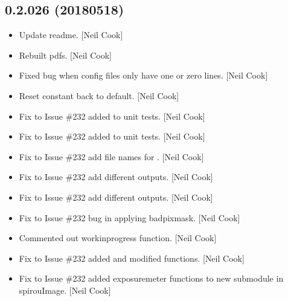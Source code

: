 \documentclass[a4paper,10pt,english]{report}
\begin{document}
\subsection{0.2.026 (2018\sphinxhyphen{}05\sphinxhyphen{}18)}
\label{\detokenize{misc/changelog:id453}}\begin{itemize}
\item {} 
Update readme. {[}Neil Cook{]}

\item {} 
Rebuilt pdfs. {[}Neil Cook{]}

\item {} 
Fixed bug when config files only have one or zero lines. {[}Neil Cook{]}

\item {} 
Reset constant back to default. {[}Neil Cook{]}

\item {} 
Fix to Issue \#232 \sphinxhyphen{} added  to unit tests. {[}Neil
Cook{]}

\item {} 
Fix to Issue \#232 \sphinxhyphen{} added  to unit tests. {[}Neil
Cook{]}

\item {} 
Fix to Issue \#232 \sphinxhyphen{} add file names for . {[}Neil Cook{]}

\item {} 
Fix to Issue \#232 \sphinxhyphen{} add different outputs. {[}Neil Cook{]}

\item {} 
Fix to Issue \#232 \sphinxhyphen{} add different outputs. {[}Neil Cook{]}

\item {} 
Fix to Issue \#232 \sphinxhyphen{} bug in applying badpixmask. {[}Neil Cook{]}

\item {} 
Commented out work\sphinxhyphen{}in\sphinxhyphen{}progress function. {[}Neil Cook{]}

\item {} 
Fix to Issue \#232 \sphinxhyphen{} added  and modified
 functions. {[}Neil Cook{]}

\item {} 
Fix to Issue \#232 \sphinxhyphen{} added exposure\sphinxhyphen{}meter functions to new sub\sphinxhyphen{}module
in spirouImage. {[}Neil Cook{]}


\end{itemize}
\end{document}
